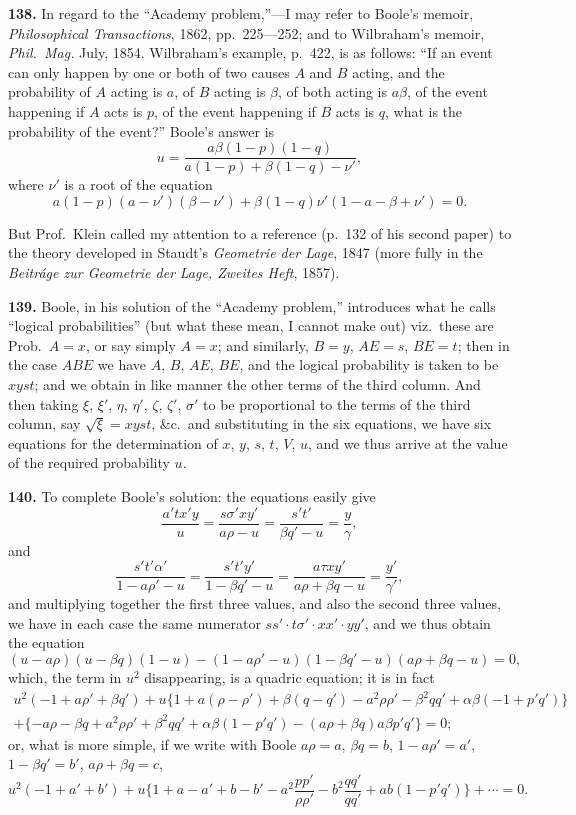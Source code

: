 \documentclass[11pt,a4paper]{book}
\begin{document}
\begin{center}
\textbf{138.} In regard to the ``Academy problem,''---I may refer to Boole's memoir,
\textit{Philosophical Transactions}, 1862, pp.~225---252; and to Wilbraham's memoir, \textit{Phil.~Mag.}
July, 1854. Wilbraham's example, p.~422, is as follows: ``If an event can only happen
by one or both of two causes $A$ and $B$ acting, and the probability of $A$ acting is $a$, of
$B$ acting is $\beta$, of both acting is $a\beta$, of the event happening if $A$ acts is $p$, of the event
happening if $B$ acts is $q$, what is the probability of the event?'' Boole's answer is
\[
u = \frac{a\beta(1-p)(1-q)}{a(1-p)+\beta(1-q)-\nu'},
\]
where $\nu'$ is a root of the equation
\[
a(1-p)(a-\nu')(\beta-\nu')+\beta(1-q)\nu'(1-a-\beta+\nu')=0.
\]

But Prof.\ Klein called my attention to a reference (p.~132 of his second paper) to the theory
developed in Staudt's \textit{Geometrie der Lage}, 1847 (more fully in the \textit{Beitr\'{a}ge zur Geometrie der}
\textit{Lage, Zweites Heft}, 1857).

\textbf{139.} Boole, in his solution of the ``Academy problem,'' introduces what he calls
``logical probabilities'' (but what these mean, I cannot make out) viz.\ these are
Prob.\ $A=x$, or say simply $A=x$; and similarly, $B=y$, $AE=s$, $BE=t$; then in the case
$ABE$ we have $A$, $B$, $AE$, $BE$, and the logical probability is taken to be $xyst$; and we
obtain in like manner the other terms of the third column. And then taking $\xi$, $\xi'$,
$\eta$, $\eta'$, $\zeta$, $\zeta'$, $\sigma'$ to be proportional to the terms of the third column, say
$\sqrt{\xi}=xyst$, \&c.\ and substituting in the six equations, we have six equations for
the determination of $x$, $y$, $s$, $t$, $V$, $u$, and we thus arrive at the value of the required
probability $u$.

\textbf{140.} To complete Boole's solution: the equations easily give
\[
\frac{a'tx'y}{u} = \frac{s\sigma'xy'}{a\rho-u} = \frac{s't'}{\beta q'-u} = \frac{y}{\gamma},
\]
and
\[
\frac{s't'\alpha'}{1-a\rho'-u} = \frac{s't'y'}{1-\beta q'-u} = \frac{a\tau xy'}{a\rho+\beta q-u} = \frac{y'}{\gamma'},
\]
and multiplying together the first three values, and also the second three values, we
have in each case the same numerator $ss'\cdot t\sigma'\cdot xx'\cdot yy'$, and we thus obtain the equation
\[
(u-a\rho)(u-\beta q)(1-u)-(1-a\rho'-u)(1-\beta q'-u)(a\rho+\beta q-u)=0,
\]
which, the term in $u^2$ disappearing, is a quadric equation; it is in fact
\begin{multline*}
u^2(-1+a\rho'+\beta q') + u\{1+a(\rho-\rho')+\beta(q-q')-a^2\rho\rho'-\beta^2qq'+\alpha\beta(-1+p'q')\}\\
+ \{-a\rho-\beta q+a^2\rho\rho'+\beta^2qq'+\alpha\beta(1-p'q')-(a\rho+\beta q)a\beta p'q'\} = 0;
\end{multline*}
or, what is more simple, if we write with Boole $a\rho=a$, $\beta q=b$, $1-a\rho'=a'$, $1-\beta q'=b'$,
$a\rho+\beta q=c$,
\[
u^2(-1+a'+b') + u\{1+a-a'+b-b'-a^2\frac{pp'}{\rho\rho'}-b^2\frac{qq'}{qq'}+ab(1-p'q')\} + \cdots = 0.
\]


\end{center}
\end{document}
